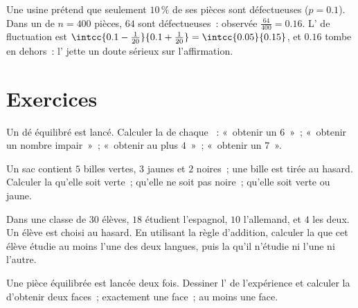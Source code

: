 \begin{example}\label{ex:g10:proba:test}
Une usine prétend que seulement $10\,\%$ de ses pièces sont défectueuses
($p = 0.1$). Dans un  de $n = 400$ pièces, $64$ sont
défectueuses~:  observée $\frac{64}{400} = 0.16$. L'
de fluctuation est
$\intcc{0.1 - \frac{1}{20}}{0.1 + \frac{1}{20}} = \intcc{0.05}{0.15}$,
et $0.16$ tombe en dehors~: l' jette un doute sérieux sur
l'affirmation.
\end{example}

\section{Exercices}

\begin{exercise}[$\star$]\label{exo:g10:proba:1}
Un dé équilibré est lancé. Calculer la  de chaque ~:
«~obtenir un $6$~»~; «~obtenir un nombre impair~»~; «~obtenir au plus
$4$~»~; «~obtenir un $7$~».
\end{exercise}

\begin{exercise}[$\star$]\label{exo:g10:proba:2}
Un sac contient $5$ billes vertes, $3$ jaunes et $2$ noires~; une bille
est tirée au hasard. Calculer la  qu'elle soit verte~; qu'elle
ne soit pas noire~; qu'elle soit verte ou jaune.
\end{exercise}

\begin{exercise}[$\star$]\label{exo:g10:proba:3}
Dans une classe de $30$ élèves, $18$ étudient l'espagnol, $10$
l'allemand, et $4$ les deux. Un élève est choisi au hasard. En utilisant
la règle d'addition, calculer la  que cet élève étudie au
moins l'une des deux langues, puis la  qu'il n'étudie ni
l'une ni l'autre.
\end{exercise}

\begin{exercise}[$\star$]\label{exo:g10:proba:4}
Une pièce équilibrée est lancée deux fois. Dessiner l' de
l'expérience et calculer la  d'obtenir deux faces~; exactement
une face~; au moins une face.
\end{exercise}


